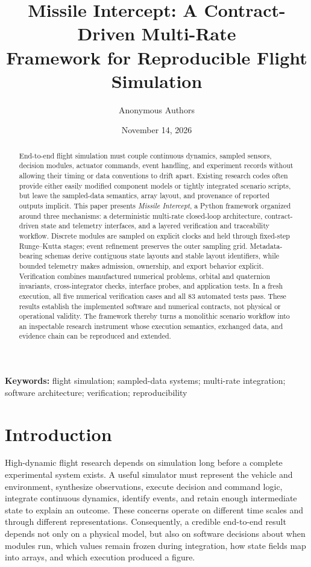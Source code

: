 \documentclass[11pt,a4paper]{article}
\title{\vspace{-1em}\textbf{Missile Intercept: A Contract-Driven Multi-Rate\\Framework for Reproducible Flight Simulation}}
\author{Anonymous Authors}
\date{November 14, 2026}
\begin{document}
\maketitle
\thispagestyle{plain}
\begin{abstract}
End-to-end flight simulation must couple continuous dynamics, sampled sensors, decision modules, actuator commands, event handling, and experiment records without allowing their timing or data conventions to drift apart. Existing research codes often provide either easily modified component models or tightly integrated scenario scripts, but leave the sampled-data semantics, array layout, and provenance of reported outputs implicit. This paper presents \emph{Missile Intercept}, a Python framework organized around three mechanisms: a deterministic multi-rate closed-loop architecture, contract-driven state and telemetry interfaces, and a layered verification and traceability workflow. Discrete modules are sampled on explicit clocks and held through fixed-step Runge--Kutta stages; event refinement preserves the outer sampling grid. Metadata-bearing schemas derive contiguous state layouts and stable layout identifiers, while bounded telemetry makes admission, ownership, and export behavior explicit. Verification combines manufactured numerical problems, orbital and quaternion invariants, cross-integrator checks, interface probes, and application tests. In a fresh execution, all five numerical verification cases and all 83 automated tests pass. These results establish the implemented software and numerical contracts, not physical or operational validity. The framework thereby turns a monolithic scenario workflow into an inspectable research instrument whose execution semantics, exchanged data, and evidence chain can be reproduced and extended.
\end{abstract}
\noindent\textbf{Keywords:} flight simulation; sampled-data systems; multi-rate integration; software architecture; verification; reproducibility

\section{Introduction}
High-dynamic flight research depends on simulation long before a complete experimental system exists. A useful simulator must represent the vehicle and environment, synthesize observations, execute decision and command logic, integrate continuous dynamics, identify events, and retain enough intermediate state to explain an outcome. These concerns operate on different time scales and through different representations. Consequently, a credible end-to-end result depends not only on a physical model, but also on software decisions about when modules run, which values remain frozen during integration, how state fields map into arrays, and which execution produced a figure.
\end{document}

